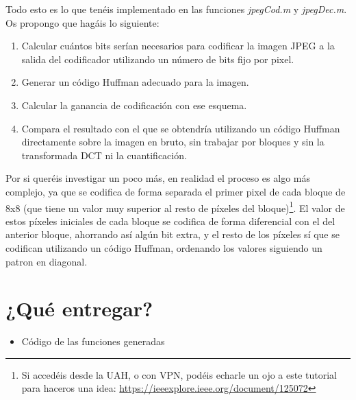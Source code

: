 \documentclass[es,practica]{uah}
\begin{document}
Todo esto es lo que tenéis implementado en las funciones \emph{jpegCod.m} y \emph{jpegDec.m}.
Os propongo que hagáis lo siguiente:

\begin{enumerate}
	\item Calcular cuántos bits serían necesarios para codificar la imagen JPEG a la salida del codificador utilizando un número de bits fijo por pixel. 
	\item Generar un código Huffman adecuado para la imagen.
	\item Calcular la ganancia de codificación con ese esquema.
	\item Compara el resultado con el que se obtendría utilizando un código Huffman directamente sobre la imagen en bruto, sin trabajar por bloques y sin la transformada DCT ni la cuantificación. 
\end{enumerate}

Por si queréis investigar un poco más, en realidad el proceso es algo más complejo, ya que se codifica de forma separada el primer pixel de cada bloque de 8x8 (que tiene un valor muy superior al resto de píxeles del bloque)\footnote{Si accedéis desde la UAH, o con VPN, podéis echarle un ojo a este tutorial para haceros una idea: \url{https://ieeexplore.ieee.org/document/125072}}. El valor de estos píxeles iniciales de cada bloque se codifica de forma diferencial con el del anterior bloque, ahorrando así algún bit extra, y el resto de los píxeles sí que se codifican utilizando un código Huffman, ordenando los valores siguiendo un patron en diagonal.




\section{¿Qué entregar?}
\begin{itemize}
	\item Código de las funciones generadas
\end{itemize}
\end{document}
